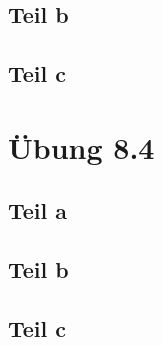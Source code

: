 \documentclass[10pt,a4paper]{article}
\begin{document}
\subsection{Teil b}

\subsection{Teil c}

\section{Übung 8.4}

\subsection{Teil a}

\subsection{Teil b}

\subsection{Teil c}
\end{document}
